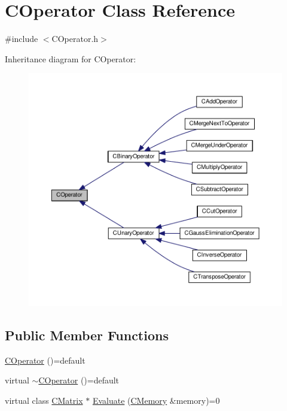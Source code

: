 \hypertarget{classCOperator}{}\section{C\+Operator Class Reference}
\label{classCOperator}


{\ttfamily \#include $<$C\+Operator.\+h$>$}



Inheritance diagram for C\+Operator\+:\nopagebreak
\begin{figure}[H]
\begin{center}
\leavevmode
\includegraphics[width=350pt]{classCOperator__inherit__graph}
\end{center}
\end{figure}
\subsection*{Public Member Functions}
\begin{DoxyCompactItemize}
\item 
\hyperlink{classCOperator_a87e51bbea921716008a02f2c01cc22ae}{C\+Operator} ()=default
\item 
virtual \hyperlink{classCOperator_a55ebb3beea88394151be9204cc29ccac}{$\sim$\+C\+Operator} ()=default
\item 
virtual class \hyperlink{classCMatrix}{C\+Matrix} $\ast$ \hyperlink{classCOperator_a45c8237c879a44f839247badefe6eade}{Evaluate} (\hyperlink{classCMemory}{C\+Memory} \&memory)=0
\end{DoxyCompactItemize}


